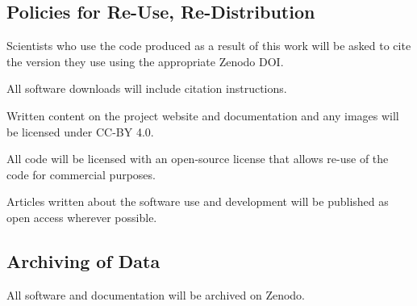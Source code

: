 \documentclass[11pt]{article}
\begin{document}



\subsection{Policies for Re-Use, Re-Distribution}
Scientists who use the code produced as a result of this work will be asked to cite the version they use using the appropriate Zenodo DOI.

All software downloads will include citation instructions.

Written content on the project website and documentation and any images will be licensed under CC-BY 4.0.

All code will be licensed with an open-source license that allows re-use of the code for commercial purposes.  

Articles written about the software use and development will be published as open access wherever possible.



\subsection{Archiving of Data}
All software and documentation will be archived on Zenodo.
\end{document}
